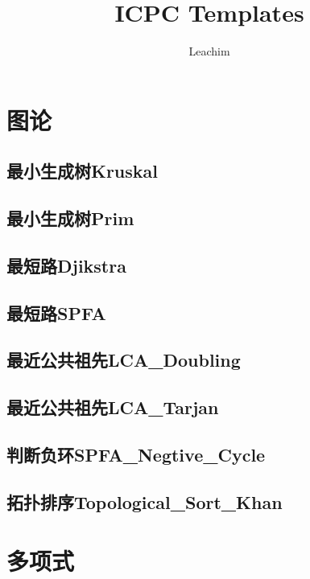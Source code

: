 \documentclass[10pt,a4paper]{article}
\begin{document}
\title{ICPC Templates}
\author {Leachim}
\maketitle
\tableofcontents

\newpage
\section{图论}
\subsection{最小生成树Kruskal}

\subsection{最小生成树Prim}

\subsection{最短路Djikstra}

\subsection{最短路SPFA}

\subsection{最近公共祖先LCA\_Doubling}

\subsection{最近公共祖先LCA\_Tarjan}

\subsection{判断负环SPFA\_Negtive\_Cycle}

\subsection{拓扑排序Topological\_Sort\_Khan}


\newpage
\section{多项式}
\end{document}
